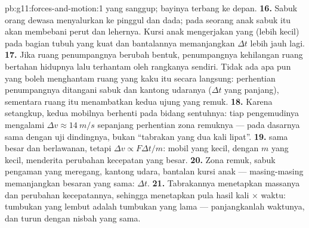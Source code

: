 \begin{solution}{pb:g11:forces-and-motion:1}
yang sanggup; bayinya terbang ke depan.
\textbf{16.} Sabuk orang dewasa menyalurkan  ke pinggul dan
dada; pada seorang anak sabuk itu akan membebani perut dan lehernya.
Kursi anak mengerjakan  yang (lebih kecil) pada bagian tubuh
yang kuat dan bantalannya memanjangkan $\Delta t$ lebih jauh lagi.
\textbf{17.} Jika ruang penumpangnya berubah bentuk, penumpangnya
kehilangan ruang bertahan hidupnya lalu terhantam oleh rangkanya
sendiri. Tidak ada apa pun yang boleh menghantam ruang yang kaku itu
secara langsung: perhentian penumpangnya ditangani sabuk dan kantong
udaranya ($\Delta t$ yang panjang), sementara ruang itu menambatkan
kedua ujung yang remuk.
\textbf{18.} Karena setangkup, kedua mobilnya berhenti pada bidang
sentuhnya: tiap pengemudinya mengalami $\Delta v \approx \qty{14}{m/s}$
sepanjang perhentian zona remuknya --- pada dasarnya sama dengan uji
dindingnya, bukan ``tabrakan yang dua kali lipat''.
\textbf{19.}  sama besar dan berlawanan, tetapi
$\Delta v \propto F\Delta t/m$: mobil yang kecil, dengan $m$ yang
kecil, menderita perubahan kecepatan yang besar.
\textbf{20.} Zona remuk, sabuk pengaman yang meregang, kantong udara,
bantalan kursi anak --- masing-masing memanjangkan besaran yang sama:
$\Delta t$.
\textbf{21.} Tabrakannya menetapkan massanya dan perubahan
kecepatannya, sehingga menetapkan pula hasil kali  $\times$ waktu:
tumbukan yang lembut adalah tumbukan yang lama --- panjangkanlah
waktunya, dan  turun dengan nisbah yang sama.
\end{solution}
